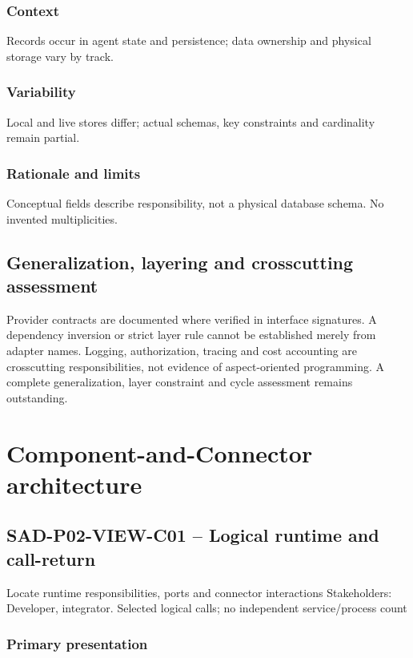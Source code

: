 \documentclass[10pt,letterpaper]{article}
\begin{document}
\subsubsection{Context}
Records occur in agent state and persistence; data ownership and physical storage vary by track.
\subsubsection{Variability}
Local and live stores differ; actual schemas, key constraints and cardinality remain partial.
\subsubsection{Rationale and limits}
Conceptual fields describe responsibility, not a physical database schema. No invented multiplicities.

\subsection{Generalization, layering and crosscutting assessment}
Provider contracts are documented where verified in interface signatures. A dependency inversion or strict layer rule cannot be established merely from adapter names. Logging, authorization, tracing and cost accounting are crosscutting responsibilities, not evidence of aspect-oriented programming. A complete generalization, layer constraint and cycle assessment remains outstanding.
\section{Component-and-Connector architecture}
\subsection{SAD-P02-VIEW-C01 -- Logical runtime and call-return}
Locate runtime responsibilities, ports and connector interactions Stakeholders: Developer, integrator. Selected logical calls; no independent service/process count
\subsubsection{Primary presentation}
\end{document}

